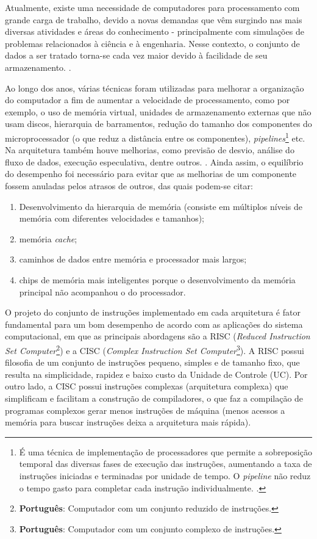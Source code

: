 Atualmente, existe uma necessidade de computadores para processamento com grande carga de trabalho, devido a novas demandas que vêm surgindo nas mais diversas atividades e áreas do conhecimento - principalmente com simulações de problemas relacionados à ciência e à engenharia. Nesse contexto, o conjunto de dados a ser tratado torna-se cada vez maior devido à facilidade de seu armazenamento. \cite[p.~16]{lima:2016:implantacao}. 

Ao longo dos anos, várias técnicas foram utilizadas para melhorar a organização do computador a fim de aumentar a velocidade de processamento, como por exemplo, o uso de memória virtual, unidades de armazenamento externas que não usam discos, hierarquia de barramentos, redução do tamanho dos componentes do microprocessador (o que reduz a distância entre os componentes), \textit{pipelines}\footnote{É uma técnica de implementação de processadores que permite a sobreposição temporal das diversas fases de execução das instruções, aumentando a taxa de instruções iniciadas e terminadas por unidade de tempo. O \textit{pipeline} não reduz o tempo gasto para completar cada instrução individualmente. \cite{stallings:2002:arquitetura}.} etc. Na arquitetura também houve melhorias, como previsão de desvio, análise do fluxo de dados, execução especulativa, dentre outros. \cite{stallings:2002:arquitetura}. Ainda assim, o equilíbrio do desempenho foi necessário para evitar que as melhorias de um componente fossem anuladas pelos atrasos de outros, das quais podem-se citar:    

\begin{enumerate}
	\item Desenvolvimento da hierarquia de memória (consiste em múltiplos níveis de memória com diferentes velocidades e tamanhos);
	\item memória \textit{cache};
	\item caminhos de dados entre memória e processador mais largos;
	\item chips de memória mais inteligentes porque o desenvolvimento da memória principal não acompanhou o do processador.
\end{enumerate}

O projeto do conjunto de instruções implementado em cada arquitetura é fator fundamental para um bom desempenho de acordo com as aplicações do sistema computacional, em que as principais abordagens são a RISC (\textit{Reduced Instruction Set Computer}\footnote{\textbf{Português}: Computador com um conjunto reduzido de instruções.}) e a CISC (\textit{Complex Instruction Set Computer}\footnote{\textbf{Português}: Computador com um conjunto complexo de instruções.}). A RISC possui filosofia de um conjunto de instruções pequeno, simples e de tamanho fixo, que resulta na simplicidade, rapidez e baixo custo da Unidade de Controle (UC). Por outro lado, a CISC possui instruções complexas (arquitetura complexa) que simplificam e facilitam a construção de compiladores, o que faz a compilação de programas complexos gerar menos instruções de máquina (menos acessos a memória para buscar instruções deixa a arquitetura mais rápida).

